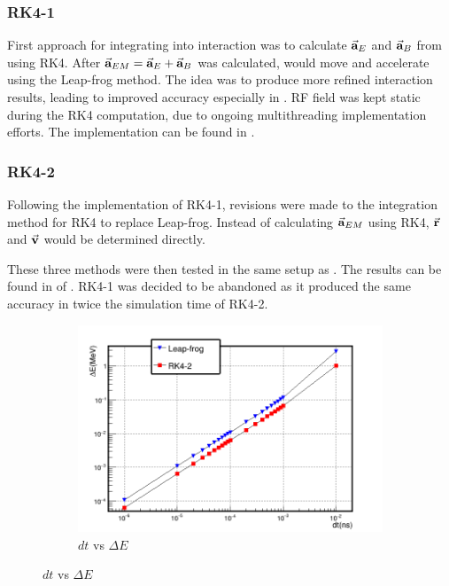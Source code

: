 \documentclass[a4paper,oneside,12pt]{report}
\numberwithin{equation}{chapter}
\begin{document}
{\subsubsection{RK4-1}
First approach for integrating  into \eEM interaction was to calculate $\vec{\textbf{a}}_{E}$ and $\vec{\textbf{a}}_{B}$ from  using RK4.
After $\vec{\textbf{a}}_{EM} = \vec{\textbf{a}}_{E} + \vec{\textbf{a}}_{B}$ was calculated, \e would move and accelerate using the Leap-frog method. 
The idea was to produce more refined interaction results, leading to improved accuracy especially in \eB.
RF field was kept static during the RK4 computation, due to ongoing multithreading implementation efforts. 
The implementation can be found in .
\subsubsection{RK4-2}
Following the implementation of RK4-1, revisions were made to the integration method for RK4 to replace Leap-frog.
Instead of calculating $\vec{\textbf{a}}_{EM}$ using RK4, $\vec{\textbf{r}}$ and $\vec{\textbf{v}}$ would be determined directly.

These three methods were then tested in the same setup as . The results can be found in  of .
RK4-1 was decided to be abandoned as it produced the same accuracy in twice the simulation time of RK4-2.
\clearpage
\iffalse \begin{figure}
    \centering
    \begin{subfigure}{0.8\textwidth}
        \centering
        \includegraphics[width=\linewidth]{./figures/analiz/mag_lf_rk2_dt-E.png}
        \caption*{$dt$ vs $\Delta E$}
    \end{subfigure}
    

\end{figure}}
\end{document}
